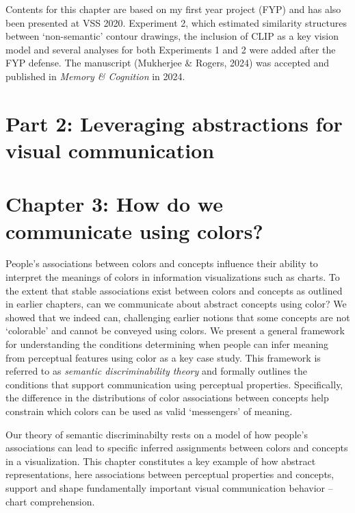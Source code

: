 \documentclass{Dissertate}
\begin{document}
\begin{tcolorbox}[
    colback=gray!10,  %
    colframe=black!50, %
    arc=4mm,         %
    boxrule=2pt      %
]
Contents for this chapter are based on my first year project (FYP) and has also been presented at VSS 2020.
Experiment 2, which estimated similarity structures between `non-semantic' contour drawings, the inclusion of CLIP as a key vision model and several analyses for both Experiments 1 and 2 were added after the FYP defense.
The manuscript (Mukherjee \& Rogers, 2024) was accepted and published in \textit{Memory \& Cognition} in 2024.
\end{tcolorbox}


\section*{\textbf{Part 2: Leveraging abstractions for visual communication}}

\section*{Chapter 3: How do we communicate using colors?}

People’s associations between colors and concepts influence their ability to interpret the meanings of colors in information visualizations such as charts.
To the extent that stable associations exist between colors and concepts as outlined in earlier chapters, can we communicate about abstract concepts using color?
We showed that we indeed can, challenging earlier notions that some concepts are not `colorable' and cannot be conveyed using colors. We present a general framework for understanding the conditions determining when people can infer meaning from perceptual features using color as a key case study. This framework is referred to as \textit{semantic discriminability theory} and formally outlines the conditions that support communication using perceptual properties.
Specifically, the difference in the distributions of color associations between concepts help constrain which colors can be used as valid `messengers' of meaning.

Our theory of semantic discriminabilty rests on a model of how people's associations can lead to specific inferred assignments between colors and concepts in a visualization.
This chapter constitutes a key example of how abstract representations, here associations between perceptual properties and concepts, support and shape fundamentally important visual communication behavior -- chart comprehension.
\end{document}
